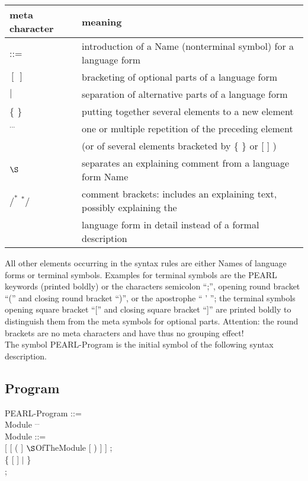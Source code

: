 \begin{tabular}{ll}
meta character & meaning \\ \hline
::=            & introduction of a Name (nonterminal symbol) for a language form\\
$[\ ]$         & bracketing of optional parts of a language form \\ 
$\mid$         & separation of alternative parts of a language form\\
\{ \}          & putting together several elements to a new element\\
$^{...}$       & one or multiple repetition of the preceding element\\
               & (or of several elements bracketed by \{ \} or [ ] ) \\
$\S $          & separates an explaining comment from a language form Name\\
$/^*$ $^*/$    & comment brackets: 
                 includes an explaining text, possibly explaining the\\
               & language form in detail instead of a formal description\\
\end{tabular}

All other elements occurring in the syntax rules are either Names of language
forms or terminal symbols. Examples for terminal symbols are the PEARL
keywords (printed boldly) or the characters semicolon ``;'', opening round
bracket ``('' and closing round bracket ``)'', 
or the apostrophe `` ' ''; the terminal symbols opening square bracket ``[''
and closing square bracket ``]'' are printed boldly to distinguish them
from the meta symbols for optional parts. Attention: the round brackets are
no meta characters and have thus no grouping effect!\\

The symbol PEARL-Program is the initial symbol of the following syntax
description.

\subsection{Program}    %

PEARL-Program ::=\\
\x Module $^{...}$\\

Module ::=\\
 [ [ ( ] $\S $OfTheModule [ ) ] ] ;\\
\x \{  [  ] 
	$\mid$  \} \\
 ;

